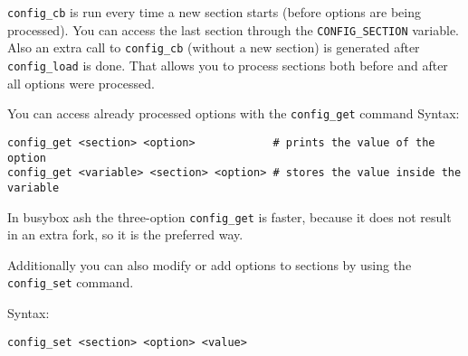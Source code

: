 \texttt{config\_cb} is run every time a new section starts (before options are being
processed). You can access the last section through the \texttt{CONFIG\_SECTION}
variable. Also an extra call to \texttt{config\_cb} (without a new section) is generated
after \texttt{config\_load} is done.
That allows you to process sections both before and after all options were
processed.

You can access already processed options with the \texttt{config\_get} command
Syntax:

\begin{Verbatim}
config_get <section> <option>            # prints the value of the option
config_get <variable> <section> <option> # stores the value inside the variable
\end{Verbatim}

In busybox ash the three-option \texttt{config\_get} is faster, because it does not
result in an extra fork, so it is the preferred way.

Additionally you can also modify or add options to sections by using the 
\texttt{config\_set} command.

Syntax:

\begin{Verbatim}
config_set <section> <option> <value>
\end{Verbatim}

